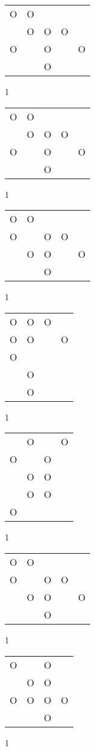 \begin{tabular}{|m{0.2cm}m{0.2cm}m{0.2cm}m{0.2cm}m{0.2cm}|}\hline
O&O& & & \\
 &O&O&O& \\
O& &O& &O\\
 & &O& & \\
\hline\end{tabular}1
\begin{tabular}{|m{0.2cm}m{0.2cm}m{0.2cm}m{0.2cm}m{0.2cm}|}\hline
O&O& & & \\
 &O&O&O& \\
O& &O& &O\\
 & &O& & \\
\hline\end{tabular}1
\begin{tabular}{|m{0.2cm}m{0.2cm}m{0.2cm}m{0.2cm}m{0.2cm}|}\hline
O&O& & & \\
O& &O&O& \\
 &O&O& &O\\
 & &O& & \\
\hline\end{tabular}1
\begin{tabular}{|m{0.2cm}m{0.2cm}m{0.2cm}m{0.2cm}|}\hline
O&O&O& \\
O&O& &O\\
O& & & \\
 &O& & \\
 &O& & \\
\hline\end{tabular}1
\begin{tabular}{|m{0.2cm}m{0.2cm}m{0.2cm}m{0.2cm}|}\hline
 &O& &O\\
O& &O& \\
 &O&O& \\
 &O&O& \\
O& & & \\
\hline\end{tabular}1
\begin{tabular}{|m{0.2cm}m{0.2cm}m{0.2cm}m{0.2cm}m{0.2cm}|}\hline
O&O& & & \\
O& &O&O& \\
 &O&O& &O\\
 & &O& & \\
\hline\end{tabular}1
\begin{tabular}{|m{0.2cm}m{0.2cm}m{0.2cm}m{0.2cm}|}\hline
O& &O& \\
 &O&O& \\
O&O&O&O\\
 & &O& \\
\hline\end{tabular}1
